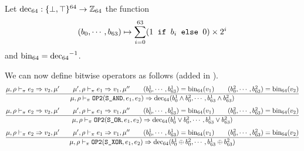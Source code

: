 Let \(\operatorname{dec_{64}}: \{ \bot, \top \}^{64} \to \mathbb{Z}_{64}\) the function
\[(b_0, \cdots, b_{63}) \mapsto \sum_{i=0}^{63} (1\texttt{ if } b_i\texttt{ else }0)\times 2^i\]
and \(\operatorname{bin_{64}} = \operatorname{dec_{64}}^{-1}\).

We can now define bitwise operators as follows (added in \Cpm).\\
\[\dfrac{\mu,\rho\vdash_\pi e_2\Rightarrow v_2,\mu' \qquad \mu',\rho\vdash_\pi e_1\Rightarrow v_1,\mu'' \qquad (b_0^1,\cdots,b_{63}^1) = \operatorname{bin_{64}}(v_1) \qquad (b_0^2,\cdots,b_{63}^2) = \operatorname{bin_{64}}(v_2)}{\mu,\rho\vdash_\pi \texttt{OP2}(\texttt{S\_AND}, e_1, e_2) \Rightarrow \operatorname{dec_{64}}(b_0^1 \wedge b_0^2,\cdots, b_{63}^1 \wedge b_{63}^2)}\]
\[\dfrac{\mu,\rho\vdash_\pi e_2\Rightarrow v_2,\mu' \qquad \mu',\rho\vdash_\pi e_1\Rightarrow v_1,\mu'' \qquad (b_0^1,\cdots,b_{63}^1) = \operatorname{bin_{64}}(v_1) \qquad (b_0^2,\cdots,b_{63}^2) = \operatorname{bin_{64}}(v_2)}{\mu,\rho\vdash_\pi \texttt{OP2}(\texttt{S\_OR}, e_1, e_2) \Rightarrow \operatorname{dec_{64}}(b_0^1 \vee b_0^2,\cdots, b_{63}^1 \vee b_{63}^2)}\]
\[\dfrac{\mu,\rho\vdash_\pi e_2\Rightarrow v_2,\mu' \qquad \mu',\rho\vdash_\pi e_1\Rightarrow v_1,\mu'' \qquad (b_0^1,\cdots,b_{63}^1) = \operatorname{bin_{64}}(v_1) \qquad (b_0^2,\cdots,b_{63}^2) = \operatorname{bin_{64}}(v_2)}{\mu,\rho\vdash_\pi \texttt{OP2}(\texttt{S\_XOR}, e_1, e_2) \Rightarrow \operatorname{dec_{64}}(b_0^1 \oplus b_0^2,\cdots, b_{63}^1 \oplus b_{63}^2)}\]



